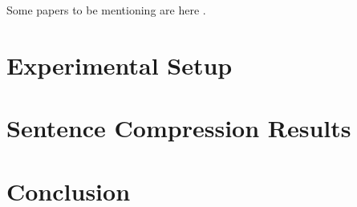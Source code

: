\documentclass[11pt]{article}
\begin{document}
Some papers to be mentioning are here
\cite{langkilde1998practical,langkilde1998generation,Lin2001,Bhagat2008}.

\section{Experimental Setup}
\label{sec-setup}



\section{Sentence Compression Results}
\label{sec-results}


\section{Conclusion}
\label{sec-conclusion}



\end{document}

